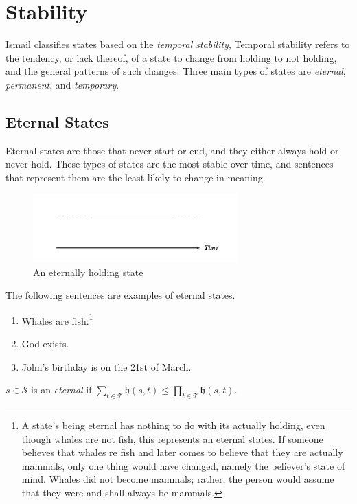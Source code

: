 \section{Stability}
Ismail \cite{ismail2013stability} classifies states based on the \textit{temporal stability}, Temporal stability refers to the tendency, or
lack thereof, of a state to change from holding to not holding, and the general patterns of such changes.
Three main types of states are \textit{eternal}, \textit{permanent}, and \textit{temporary}.

\subsection{Eternal States}
Eternal states are those that never start or end, and they either always hold or never hold.
These types of states are the most stable over time, and sentences that represent them are the least likely to change in meaning.
\begin{figure}[H]
  \centering
  \includegraphics[width=0.7\textwidth]{images/eternal-states.png}
  \caption{An eternally holding state}
  \label{fig:eternal}
\end{figure}

The following sentences are examples of eternal states.

\begin{enumerate}
  \item Whales are fish.\footnote{A state’s being eternal has nothing to do with its actually holding, even though whales are not fish,
          this represents an eternal states. If someone believes that whales re fish and later comes to believe that they are actually mammals, only one thing would have
          changed, namely the believer’s state of mind. Whales did not become mammals; rather, the person
          would assume that they were and shall always be mammals.\cite{ismail2001reasoning}}
  \item God exists.
  \item John's birthday is on the 21st of March.
\end{enumerate}

\begin{defn}
  $s \in \mathcal{S}$ is an \textit{eternal} if $\displaystyle \sum_{t \in \mathcal{T}} \mathfrak{h}(s, t) \leq \prod_{t \in \mathcal{T}} \mathfrak{h}(s, t)$.
\end{defn}

